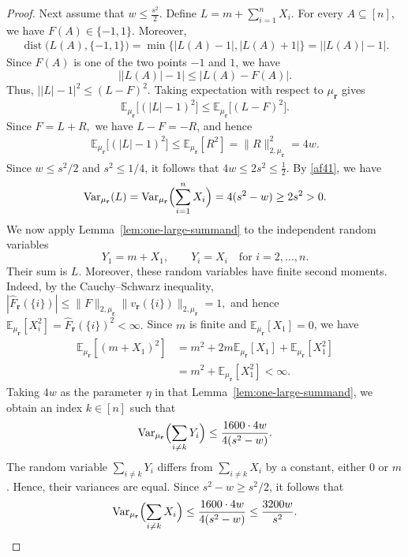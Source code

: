 \documentclass[11pt]{article}
\numberwithin{equation}{section}
\theoremstyle{definition}
\theoremstyle{remark}
\begin{document}
\begin{proof}
Next assume that
$
w\leq\frac{s^2}{2}.
$
Define
$
L=m+\sum_{i=1}^nX_i.
$
For every $A\subseteq[n]$, we have $F(A)\in\{-1,1\}$. Moreover,
$$
\begin{aligned}
\operatorname{dist}\bigl(L(A),\{-1,1\}\bigr)
=
\min\{|L(A)-1|,|L(A)+1|\}=
\bigl||L(A)|-1\bigr|.
\end{aligned}
$$
Since $F(A)$ is one of the two points $-1$ and $1$, we have
$$
\bigl||L(A)|-1\bigr|
\leq|L(A)-F(A)|.
$$
Thus, 
$
\bigl||L|-1\bigr|^2\leq(L-F)^2.
$
Taking expectation with respect to $\mu_{\mathbf r}$ gives
$$
\mathbb E_{\mu_{\mathbf r}}\bigl[(|L|-1)^2\bigr]
\leq
\mathbb E_{\mu_{\mathbf r}}\bigl[(L-F)^2\bigr].
$$
Since
$
F=L+R,
$
we have $L-F=-R$, and hence
$$
\begin{aligned}
\mathbb E_{\mu_{\mathbf r}}\bigl[(|L|-1)^2\bigr]
\leq
\mathbb E_{\mu_{\mathbf r}}[R^2]=\|R\|_{2,\mu_{\mathbf r}}^2=4w.
\end{aligned}
$$
Since $w\leq s^2/2$ and $s^2\leq1/4$, it follows that
$
4w\leq2s^2\leq\frac12.
$
By \eqref{af41}, we have
$$
\begin{aligned}
\operatorname{Var}_{\mu_{\mathbf r}}(L)
=
\operatorname{Var}_{\mu_{\mathbf r}}
\Bigl(\sum_{i=1}^nX_i\Bigr)=4(s^2-w)\geq2s^2>0.
\end{aligned}
$$
We now apply Lemma~\ref{lem:one-large-summand} to the independent
random variables
$$
Y_1=m+X_1,
\qquad
Y_i=X_i\quad\text{for }i=2,\ldots,n.
$$
Their sum is $L$.  Moreover, these random variables have finite second moments. Indeed,
by the Cauchy--Schwarz inequality,
$
\left|\widehat F_{\mathbf r}(\{i\})\right|
\leq
\|F\|_{2,\mu_{\mathbf r}}
\|v_{\mathbf r}(\{i\})\|_{2,\mu_{\mathbf r}}
=1,
$
and hence
$
\mathbb E_{\mu_{\mathbf r}}[X_i^2]
=
\widehat F_{\mathbf r}(\{i\})^2
<\infty.
$
Since $m$ is finite and $\mathbb E_{\mu_{\mathbf r}}[X_1]=0$, we have
$$
\begin{aligned}
\mathbb E_{\mu_{\mathbf r}}[(m+X_1)^2]
&=
m^2
+2m\mathbb E_{\mu_{\mathbf r}}[X_1]
+\mathbb E_{\mu_{\mathbf r}}[X_1^2]\\
&=
m^2+\mathbb E_{\mu_{\mathbf r}}[X_1^2]<\infty.
\end{aligned}
$$
Taking $4w$ as the parameter $\eta$ in that Lemma~\ref{lem:one-large-summand},
we obtain an index $k\in[n]$ such that
$$
\operatorname{Var}_{\mu_{\mathbf r}}
\Bigl(\sum_{i\neq k}Y_i\Bigr)
\leq
\frac{1600\cdot4w}
{4(s^2-w)}.
$$
The random variable $\sum_{i\neq k}Y_i$ differs from
$\sum_{i\neq k}X_i$ by a constant, either $0$ or $m$. Hence, their
variances are equal. Since $s^2-w\geq s^2/2$, it follows that
$$
\begin{aligned}
\operatorname{Var}_{\mu_{\mathbf r}}
\Bigl(\sum_{i\neq k}X_i\Bigr)
\leq
\frac{1600\cdot4w}
{4(s^2-w)}\leq
\frac{3200w}{s^2}.
\end{aligned}
$$


\end{proof}
\end{document}

